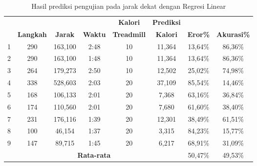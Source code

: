 \begin{longtable}{|c|c|c|c|c|c|c|c|}
  \caption{Hasil prediksi pengujian pada jarak dekat dengan Regresi Linear}
  \label{tb:PengujianJarakDekatAnalisaPrediksiRegresi}                                   \\
  \hline
  \rowcolor[HTML]{C0C0C0}
  & & & & \textbf{Kalori} & \textbf{Prediksi} & & \\
  \rowcolor[HTML]{C0C0C0}
  \multirow{-2}{*}{\textbf{Percobaan}} & \multirow{-2}{*}{\textbf{Langkah}} & \multirow{-2}{*}{\textbf{Jarak}} & \multirow{-2}{*}{\textbf{Waktu}} & \textbf{Treadmill} & \textbf{Kalori} & \multirow{-2}{*}{\textbf{Eror\%}} & \multirow{-2}{*}{\textbf{Akurasi\%}} \\
  
  \hline
  1   & 290   & 163,100    & 2:48    & 10    & 11,364   & 13,64\%      & 86,36\%   \\
  \hline  
  2   & 290   & 163,100    & 1:48    & 10    & 11,364   & 13,64\%      & 86,36\%  \\
  \hline
  3   & 264   & 179,273    & 2:50    & 10    & 12,502   & 25,02\%      & 74,98\%   \\
  \hline
  4   & 338   & 528,603    & 2:03    & 20    & 37,109   & 85,54\%      & 14,46\%  \\
  \hline
  5   & 168   & 106,133    & 2:01    & 20    & 7,368    & 63,16\%      & 36,84\%    \\
  \hline
  6   & 174   & 110,560    & 2:01    & 20    & 7,680    & 61,60\%      & 38,40\%   \\
  \hline
  7   & 231   & 176,116    & 1:39    & 20    & 12,301   & 38,49\%      & 61,51\%   \\
  \hline
  8   & 100   & 46,154     & 1:37    & 20    & 3,315    & 84,23\%      & 15,77\%   \\
  \hline
  9   & 147   & 89,715     & 1:45    & 20    & 6,217    & 68,91\%      & 31,09\%   \\
  \hline

  \multicolumn{6}{|c|}{\textbf{Rata-rata}} & 50,47\% & 49,53\%  \\
  \hline
\end{longtable}

